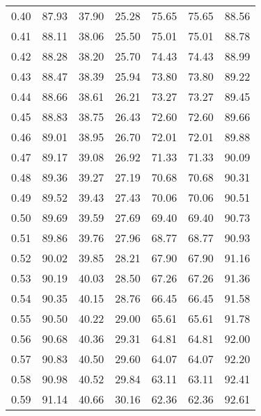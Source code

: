 \begin{tabular}{|c|c|c|c|c|c|c|}
      0.40 &     87.93 &     37.90 &      25.28 &   75.65 &      75.65 &         88.56 \\
      0.41 &     88.11 &     38.06 &      25.50 &   75.01 &      75.01 &         88.78 \\
      0.42 &     88.28 &     38.20 &      25.70 &   74.43 &      74.43 &         88.99 \\
      0.43 &     88.47 &     38.39 &      25.94 &   73.80 &      73.80 &         89.22 \\
      0.44 &     88.66 &     38.61 &      26.21 &   73.27 &      73.27 &         89.45 \\
      0.45 &     88.83 &     38.75 &      26.43 &   72.60 &      72.60 &         89.66 \\
      0.46 &     89.01 &     38.95 &      26.70 &   72.01 &      72.01 &         89.88 \\
      0.47 &     89.17 &     39.08 &      26.92 &   71.33 &      71.33 &         90.09 \\
      0.48 &     89.36 &     39.27 &      27.19 &   70.68 &      70.68 &         90.31 \\
      0.49 &     89.52 &     39.43 &      27.43 &   70.06 &      70.06 &         90.51 \\
      0.50 &     89.69 &     39.59 &      27.69 &   69.40 &      69.40 &         90.73 \\
      0.51 &     89.86 &     39.76 &      27.96 &   68.77 &      68.77 &         90.93 \\
      0.52 &     90.02 &     39.85 &      28.21 &   67.90 &      67.90 &         91.16 \\
      0.53 &     90.19 &     40.03 &      28.50 &   67.26 &      67.26 &         91.36 \\
      0.54 &     90.35 &     40.15 &      28.76 &   66.45 &      66.45 &         91.58 \\
      0.55 &     90.50 &     40.22 &      29.00 &   65.61 &      65.61 &         91.78 \\
      0.56 &     90.68 &     40.36 &      29.31 &   64.81 &      64.81 &         92.00 \\
      0.57 &     90.83 &     40.50 &      29.60 &   64.07 &      64.07 &         92.20 \\
      0.58 &     90.98 &     40.52 &      29.84 &   63.11 &      63.11 &         92.41 \\
      0.59 &     91.14 &     40.66 &      30.16 &   62.36 &      62.36 &         92.61 \\

\end{tabular}
